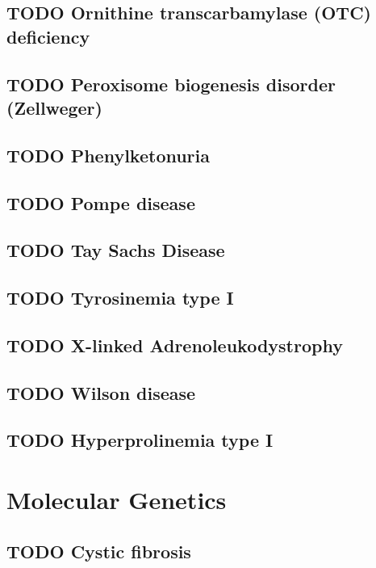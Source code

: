 \documentclass{scrartcl}
\begin{document}
\subsection{{\bfseries\sffamily TODO} Ornithine transcarbamylase (OTC) deficiency}
\label{sec:orga1060dd}
\subsection{{\bfseries\sffamily TODO} Peroxisome biogenesis disorder (Zellweger)}
\label{sec:orgdfbc3cb}
\subsection{{\bfseries\sffamily TODO} Phenylketonuria}
\label{sec:org8bc1455}
\subsection{{\bfseries\sffamily TODO} Pompe disease}
\label{sec:org4442425}
\subsection{{\bfseries\sffamily TODO} Tay Sachs Disease}
\label{sec:org2e1bcea}
\subsection{{\bfseries\sffamily TODO} Tyrosinemia type I}
\label{sec:org677b291}
\subsection{{\bfseries\sffamily TODO} X-linked Adrenoleukodystrophy}
\label{sec:orgf7603f7}
\subsection{{\bfseries\sffamily TODO} Wilson disease}
\label{sec:orga196dcb}
\subsection{{\bfseries\sffamily TODO} Hyperprolinemia type I}
\label{sec:org2e8c26d}

\section{Molecular Genetics}
\label{sec:orgec79d1a}
\subsection{{\bfseries\sffamily TODO} Cystic fibrosis}
\label{sec:org6ee23d7}
\end{document}

